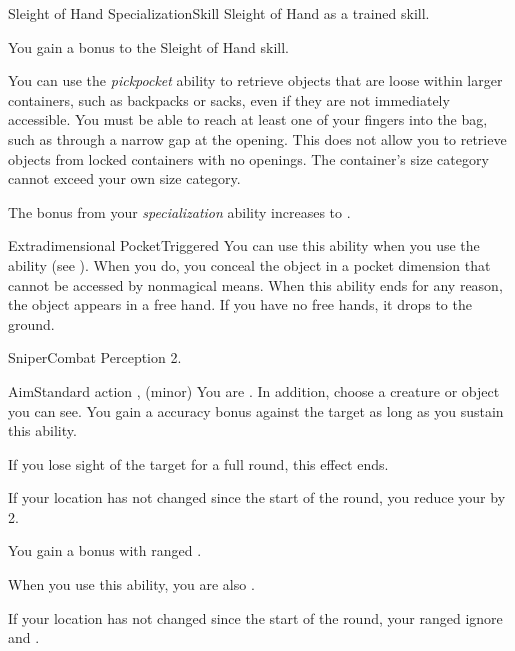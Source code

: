   \begin{feat}{Sleight of Hand Specialization}{Skill}
    \featpre Sleight of Hand as a trained skill.

     You gain a  bonus to the Sleight of Hand skill.

     You can use the \textit{pickpocket} ability to retrieve objects that are loose within larger containers, such as backpacks or sacks, even if they are not immediately accessible.
    You must be able to reach at least one of your fingers into the bag, such as through a narrow gap at the opening.
    This does not allow you to retrieve objects from locked containers with no openings.
    The container's size category cannot exceed your own size category.

     The bonus from your \textit{specialization} ability increases to .

    \begin{magicalattuneability}{Extradimensional Pocket}{Triggered}
      \abilitytags {}
      \rankline
      You can use this ability when you use the  ability (see ).
      When you do,  you conceal the object in a pocket dimension that cannot be accessed by nonmagical means.
      When this ability ends for any reason, the object appears in a free hand.
      If you have no free hands, it drops to the ground.
    \end{magicalattuneability}
  \end{feat}

  \begin{feat}{Sniper}{Combat}
    \featpre Perception 2.

    \begin{sustainability}{Aim}{Standard action}
      \abilitytags {},  (minor)
      \rankline
      You are  \focused.
      In addition, choose a creature or object you can see.
      You gain a  accuracy bonus against the target as long as you sustain this ability.

      If you lose sight of the target for a full round, this effect ends.
    \end{sustainability}

     If your location has not changed since the start of the round, you reduce your  by 2.

     You gain a   bonus with ranged .

     When you use this ability, you are also  \honed.

     If your location has not changed since the start of the round, your ranged  ignore  and .
  \end{feat}

